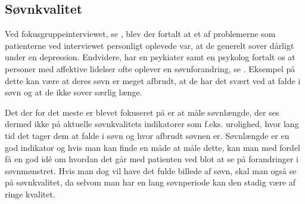 \subsection{Søvnkvalitet}
Ved fokusgruppeinterviewet, se \citep[Kapitel 1, Sektion 5]{misc:faellesrapp} , blev der fortalt at et af problemerne som patienterne ved interviewet personligt oplevede var, at de generelt sover dårligt under en depression.
Endvidere, har en psykiater samt en psykolog fortalt os at personer med affektive lidelser ofte oplever en søvnforandring, se \citep[Kapitel 1, Sektion 3 og 4]{misc:faellesrapp} .
Eksempel på dette kan være at deres søvn er meget afbrudt, at de har det svært ved at falde i søvn og at de ikke sover særlig længe.

Det der for det meste er blevet fokuseret på er at måle søvnlængde, der ses dermed ikke på aktuelle søvnkvalitets indikatorer som f.eks. urolighed, hvor lang tid det tager dem at falde i søvn og hvor afbrudt søvnen er.
Søvnlængde er en god indikator og hvis man kan finde en måde at måle dette, kan man med fordel få en god idé om hvordan det går med patienten ved blot at se på forandringer i søvnmønstret. 
Hvis man dog vil have det fulde billede af søvn, skal man også se på søvnkvalitet, da selvom man har en lang søvnperiode kan den stadig være af ringe kvalitet.